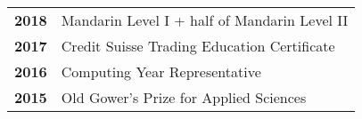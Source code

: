 \documentclass[a4paper, 10pt, oneside]{article}
\begin{document}
\begin{center}
\begin{minipage}[t]{0.48\textwidth}
\begin{tabularx}{1\linewidth}{>{\raggedright\scshape}p{1cm}X}
\textbf{2018}    & Mandarin Level I + half of Mandarin Level II \\
\textbf{2017}    & Credit Suisse Trading Education Certificate \\
\textbf{2016}    & Computing Year Representative \\ 
\textbf{2015}    & Old Gower's Prize for Applied Sciences \\
\end{tabularx}

\end{minipage} %

\end{center}
\end{document}
